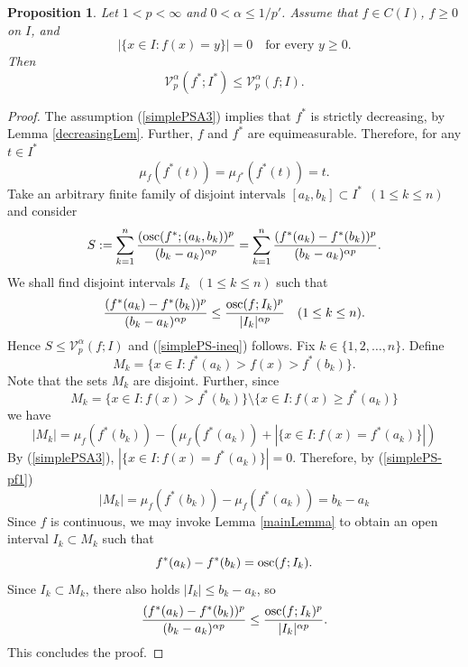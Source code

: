 \documentclass{amsart}
\newtheorem{prop}[theorem]{Proposition}
\DeclareMathOperator{\osc}{{\rm osc}}
\numberwithin{equation}{section}
\begin{document}
\begin{prop}
    \label{simplePS}
    Let $1<p<\infty$ and $0<\alpha\le 1/p'$. Assume that $f\in C(I)$, $f\ge0$ on $I$, and 
    \begin{equation}
        \label{simplePSA3}
        |\{x\in I:f(x)=y\}|=0\quad\text{for every } y\ge0.
    \end{equation}
    Then 
    \begin{equation}
        \label{simplePS-ineq}
        \mathcal{V}_p^\alpha(f^*;I^*)\le\mathcal{V}_p^\alpha(f;I).
    \end{equation}
\end{prop}
\begin{proof}
    The assumption (\ref{simplePSA3}) implies that $f^*$ is strictly decreasing, by Lemma \ref{decreasingLem}. Further, $f$ and $f^*$ are equimeasurable. Therefore, for any $t\in I^*$
    \begin{equation}
        \label{simplePS-pf1}
        \mu_f(f^*(t))=\mu_{f^*}(f^*(t))=t.
    \end{equation}
    Take an arbitrary finite family of disjoint intervals $[a_k,b_k]\subset I^*~~(1\le k\le n)$ and consider
    $$
    S:=\sum_{k=1}^n\frac{(\osc(f^*;(a_k,b_k))^p}{(b_k-a_k)^{\alpha p}}=\sum_{k=1}^n\frac{(f^*(a_k)-f^*(b_k))^p}{(b_k-a_k)^{\alpha p}}.
    $$
     We shall find disjoint intervals $I_k~~(1\le k\le n)$ such that
    \begin{equation}
        \label{ineq1}
        \frac{(f^*(a_k)-f^*(b_k))^p}{(b_k-a_k)^{\alpha p}}\le\frac{\osc(f;I_k)^p}{|I_k|^{\alpha p}}\quad(1\le k\le n).
    \end{equation}
    Hence $S\le\mathcal{V}_p^\alpha(f;I)$ and  (\ref{simplePS-ineq}) follows.
    Fix $k\in\{1,2,\ldots,n\}$. Define
    \begin{equation}
        \nonumber
        M_k=\{x\in I: f^*(a_k)>f(x)>f^*(b_k)\}.
    \end{equation}
    Note that the sets $M_k$ are disjoint. Further, since 
    \begin{equation}
        \nonumber
        M_k=\{x\in I:f(x)> f^*(b_k)\}\setminus\{x\in I:f(x)\ge f^*(a_k)\}
    \end{equation}
    we have
    \begin{equation}
        \nonumber
        |M_k|=\mu_f(f^*(b_k))-\left(\mu_f(f^*(a_k))+|\{x\in I:f(x)=f^*(a_k)\}|\right)
    \end{equation}
    By (\ref{simplePSA3}), $|\{x\in I:f(x)=f^*(a_k)\}|=0$. Therefore, by (\ref{simplePS-pf1})
    $$
        |M_k|=\mu_f(f^*(b_k))-\mu_f(f^*(a_k))=b_k-a_k
    $$
    Since $f$ is continuous, we may invoke Lemma \ref{mainLemma} to obtain an open interval $I_k\subset M_k$ such that
    \begin{equation}
        \nonumber
        f^*(a_k)-f^*(b_k)={\rm osc}(f;I_k).
    \end{equation}
    Since $I_k\subset M_k$, there also holds $|I_k|\le b_k-a_k$, so
    \begin{equation}
        \nonumber
        \frac{(f^*(a_k)-f^*(b_k))^p}{(b_k-a_k)^{\alpha p}}\le\frac{\osc(f;I_k)^p}{|I_k|^{\alpha p}}.
    \end{equation}
    This concludes the proof.
\end{proof}
\end{document}
